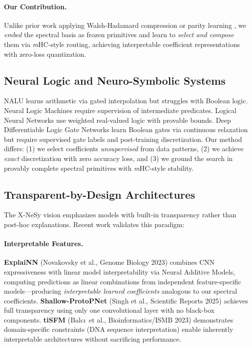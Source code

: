 \documentclass[Royal,times,sageh]{sagej}
\newcommand{\mHC}{\textit{m}HC}
\begin{document}
\paragraph{Our Contribution.} Unlike prior work applying Walsh-Hadamard compression \cite{pan2021wht} or parity learning \cite{daniely2020learning}, we \textit{embed} the spectral basis as frozen primitives and learn to \textit{select and compose} them via \mHC-style routing, achieving interpretable coefficient representations with zero-loss quantization.

\subsection{Neural Logic and Neuro-Symbolic Systems}

NALU \cite{trask2018neural} learns arithmetic via gated interpolation but struggles with Boolean logic. Neural Logic Machines \cite{dong2019neural} require supervision of intermediate predicates. Logical Neural Networks \cite{riegel2020logical} use weighted real-valued logic with provable bounds. Deep Differentiable Logic Gate Networks \cite{petersen2022deep} learn Boolean gates via continuous relaxation but require supervised gate labels and post-training discretization. Our method differs: (1) we select coefficients \textit{unsupervised} from data patterns, (2) we achieve \textit{exact} discretization with zero accuracy loss, and (3) we ground the search in provably complete spectral primitives with \mHC-style stability.

\subsection{Transparent-by-Design Architectures}

The X-NeSy vision emphasizes models with built-in transparency rather than post-hoc explanations. Recent work validates this paradigm:

\paragraph{Interpretable Features.} \textbf{ExplaiNN} (Novakovsky et al., Genome Biology 2023) combines CNN expressiveness with linear model interpretability via Neural Additive Models, computing predictions as linear combinations from independent feature-specific models---producing \textit{interpretable learned coefficients} analogous to our spectral coefficients. \textbf{Shallow-ProtoPNet} (Singh et al., Scientific Reports 2025) achieves full transparency using only one convolutional layer with no black-box components. \textbf{tiSFM} (Balc\i\ et al., Bioinformatics/ISMB 2023) demonstrates domain-specific constraints (DNA sequence interpretation) enable inherently interpretable architectures without sacrificing performance.
\end{document}
